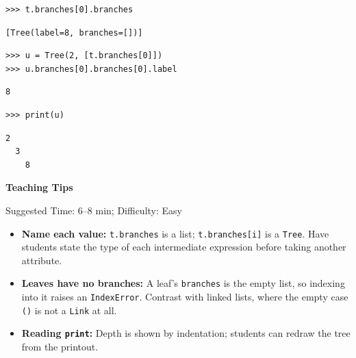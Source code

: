 \begin{blocksection}
\begin{lstlisting}
>>> t.branches[0].branches
\end{lstlisting}
\begin{solution}[.35in]
\begin{lstlisting}
[Tree(label=8, branches=[])]
\end{lstlisting}
\end{solution}
\end{blocksection}

\begin{blocksection}
\begin{lstlisting}
>>> u = Tree(2, [t.branches[0]])
>>> u.branches[0].branches[0].label
\end{lstlisting}
\begin{solution}[.35in]
\begin{lstlisting}
8
\end{lstlisting}
\end{solution}
\end{blocksection}

\begin{blocksection}
\begin{lstlisting}
>>> print(u)
\end{lstlisting}
\begin{solution}[1in]
\begin{lstlisting}
2
  3
    8
\end{lstlisting}
\end{solution}
\end{blocksection}

\begin{questionmeta}
\textbf{Teaching Tips}\par\nopagebreak[4]
Suggested Time: 6--8 min; Difficulty: Easy
\nopagebreak[4]
\begin{itemize}
    \item \textbf{Name each value:} \lstinline{t.branches} is a list; \lstinline{t.branches[i]} is a \lstinline{Tree}. Have students state the type of each intermediate expression before taking another attribute.
    \item \textbf{Leaves have no branches:} A leaf's \lstinline{branches} is the empty list, so indexing into it raises an \lstinline{IndexError}. Contrast with linked lists, where the empty case \lstinline{()} is not a \lstinline{Link} at all.
    \item \textbf{Reading \lstinline{print}:} Depth is shown by indentation; students can redraw the tree from the printout.
\end{itemize}
\end{questionmeta}
